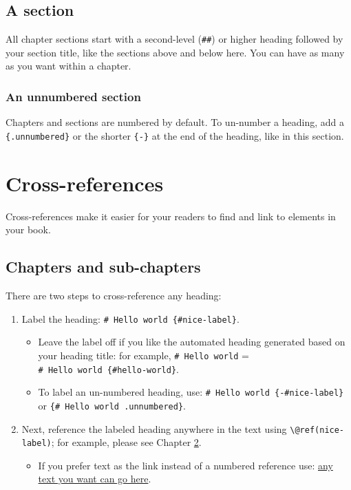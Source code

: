 \documentclass[
]{book}
\providecommand{\tightlist}{%
  \setlength{\itemsep}{0pt}\setlength{\parskip}{0pt}}
\theoremstyle{definition}
\theoremstyle{definition}
\theoremstyle{definition}
\theoremstyle{definition}
\theoremstyle{remark}
\begin{document}
\hypertarget{a-section}{%
\section{A section}\label{a-section}}

All chapter sections start with a second-level (\texttt{\#\#}) or higher heading followed by your section title, like the sections above and below here. You can have as many as you want within a chapter.

\hypertarget{an-unnumbered-section}{%
\subsection*{An unnumbered section}\label{an-unnumbered-section}}

Chapters and sections are numbered by default. To un-number a heading, add a \texttt{\{.unnumbered\}} or the shorter \texttt{\{-\}} at the end of the heading, like in this section.

\hypertarget{cross}{%
\chapter{Cross-references}\label{cross}}

Cross-references make it easier for your readers to find and link to elements in your book.

\hypertarget{chapters-and-sub-chapters}{%
\section{Chapters and sub-chapters}\label{chapters-and-sub-chapters}}

There are two steps to cross-reference any heading:

\begin{enumerate}
\def\labelenumi{\arabic{enumi}.}
\tightlist
\item
  Label the heading: \texttt{\#\ Hello\ world\ \{\#nice-label\}}.

  \begin{itemize}
  \tightlist
  \item
    Leave the label off if you like the automated heading generated based on your heading title: for example, \texttt{\#\ Hello\ world} = \texttt{\#\ Hello\ world\ \{\#hello-world\}}.
  \item
    To label an un-numbered heading, use: \texttt{\#\ Hello\ world\ \{-\#nice-label\}} or \texttt{\{\#\ Hello\ world\ .unnumbered\}}.
  \end{itemize}
\item
  Next, reference the labeled heading anywhere in the text using \texttt{\textbackslash{}@ref(nice-label)}; for example, please see Chapter \ref{cross}.

  \begin{itemize}
  \tightlist
  \item
    If you prefer text as the link instead of a numbered reference use: \protect\hyperlink{cross}{any text you want can go here}.
  \end{itemize}
\end{enumerate}
\end{document}
